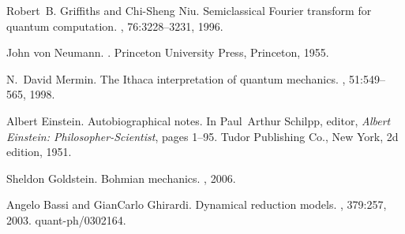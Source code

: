 \documentclass[12pt]{article} %
\begin{document}
\begin{thebibliography}{10}
Robert~B. Griffiths and Chi-Sheng Niu.
\newblock Semiclassical {F}ourier transform for quantum computation.
, 76:3228--3231, 1996.

John von Neumann.
.
\newblock Princeton University Press, Princeton, 1955.

N.~David Mermin.
\newblock The {I}thaca interpretation of quantum mechanics.
, 51:549--565, 1998.

Albert Einstein.
\newblock Autobiographical notes.
\newblock In Paul~Arthur Schilpp, editor, {\em Albert Einstein:
  Philosopher-Scientist}, pages 1--95. Tudor Publishing Co., New York, 2d
  edition, 1951.

Sheldon Goldstein.
\newblock Bohmian mechanics.
, 2006.

Angelo Bassi and GianCarlo Ghirardi.
\newblock Dynamical reduction models.
, 379:257, 2003.
\newblock quant-ph/0302164.

\end{thebibliography}
\end{document}
